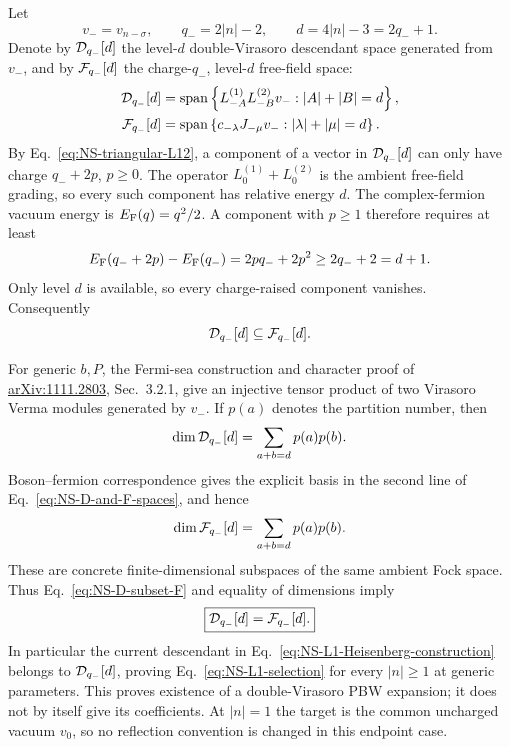 \documentclass[11pt]{article}
\begin{document}
Let
\begin{equation}
 v_-=v_{n-\sigma},
 \qquad
 q_-=2|n|-2,
 \qquad
 d=4|n|-3=2q_-+1.
\end{equation}
Denote by \({\cal D}_{q_-}[d]\) the level-\(d\) double-Virasoro descendant
space generated from \(v_-\), and by \({\cal F}_{q_-}[d]\) the
charge-\(q_-\), level-\(d\) free-field space:
\begin{align}
 {\cal D}_{q_-}[d]
 &={\rm span}\left\{
 L_{-A}^{(1)}L_{-B}^{(2)}v_-:|A|+|B|=d\right\},
 \notag\\
 {\cal F}_{q_-}[d]
 &={\rm span}\left\{
 c_{-\lambda}J_{-\mu}v_-:|\lambda|+|\mu|=d\right\}.
 \label{eq:NS-D-and-F-spaces}
\end{align}
By Eq.~\eqref{eq:NS-triangular-L12}, a component of a vector in
\({\cal D}_{q_-}[d]\) can only have charge \(q_-+2p\), \(p\geq0\).
The operator \(L_0^{(1)}+L_0^{(2)}\) is the ambient free-field grading, so
every such component has relative energy \(d\).  The complex-fermion vacuum
energy is \(E_{\rm F}(q)=q^2/2\).  A component with
\(p\geq1\) therefore requires at least
\begin{equation}
 E_{\rm F}(q_-+2p)-E_{\rm F}(q_-)
 =2pq_-+2p^2
 \geq 2q_-+2=d+1.
 \label{eq:NS-charge-raising-gap}
\end{equation}
Only level \(d\) is available, so every charge-raised component vanishes.
Consequently
\begin{equation}
 {\cal D}_{q_-}[d]\subseteq {\cal F}_{q_-}[d].
 \label{eq:NS-D-subset-F}
\end{equation}

For generic \(b,P\), the Fermi-sea construction and character proof of
\href{https://arxiv.org/abs/1111.2803}{arXiv:1111.2803}, Sec.~3.2.1, give
an injective tensor product of two Virasoro Verma modules generated by
\(v_-\).  If \(p(a)\) denotes the partition number, then
\begin{equation}
 \dim {\cal D}_{q_-}[d]
 =\sum_{a+b=d}p(a)p(b).
\end{equation}
Boson--fermion correspondence gives the explicit basis in the second line
of Eq.~\eqref{eq:NS-D-and-F-spaces}, and hence
\begin{equation}
 \dim {\cal F}_{q_-}[d]
 =\sum_{a+b=d}p(a)p(b).
\end{equation}
These are concrete finite-dimensional subspaces of the same ambient Fock
space.  Thus Eq.~\eqref{eq:NS-D-subset-F} and equality of dimensions imply
\begin{equation}
 \boxed{{\cal D}_{q_-}[d]={\cal F}_{q_-}[d].}
 \label{eq:NS-D-equals-F}
\end{equation}
In particular the current descendant in
Eq.~\eqref{eq:NS-L1-Heisenberg-construction} belongs to
\({\cal D}_{q_-}[d]\), proving Eq.~\eqref{eq:NS-L1-selection} for every
\(|n|\geq1\) at generic parameters.  This proves existence of a
double-Virasoro PBW expansion; it does not by itself give its coefficients.
At \(|n|=1\) the target is the common uncharged vacuum \(v_0\), so no
reflection convention is changed in this endpoint case.
\end{document}

